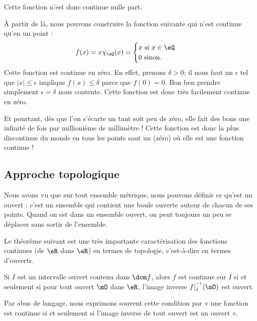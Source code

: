 Cette fonction n'est donc continue nulle part.

À partir de là, nous pouvons construire la fonction suivante qui n'est continue qu'en un point :
\[
	f(x)=x\chi_{\eQ}(x)=
	\begin{cases}
		x\text{ si }x\in\eQ \\
		0\text{ sinon.}
	\end{cases}
\]
Cette fonction est continue en zéro. En effet, prenons $\delta>0$; il nous faut un $\epsilon$ tel que $| x |\leq\epsilon$ implique $f(x)\leq \delta$ parce que $f(0)=0$. Bon ben prendre simplement $\epsilon=\delta$ nous contente. Cette fonction est donc très facilement continue en zéro.

Et pourtant, dès que l'on s'écarte un tant soit peu de zéro, elle fait des bons une infinité de fois par millionième de millimètre ! Cette fonction est donc la plus discontinue du monde en tous les points saut un (zéro) où elle est une fonction continue !

\subsection{Approche topologique}

Nous avons vu que sur tout ensemble métrique, nous pouvons définir ce qu'est un ouvert : c'est un ensemble qui contient une boule ouverte autour de chacun de ses points. Quand on est dans un ensemble ouvert, on peut toujours un peu se déplacer sans sortir de l'ensemble.

Le théorème suivant est une très importante caractérisation des fonctions continues (de $\eR$ dans $\eR$) en termes de topologie, c'est-à-dire en termes d'ouverts.

\begin{theorem}     \label{ThoContInvOuvert}
	Si $I$ est un intervalle ouvert contenu dans $\dom f$, alors $f$ est continue sur $I$ si et seulement si pour tout ouvert $\mO$ dans $\eR$, l'image inverse $f|_I^{^{-1}}(\mO)$ est ouvert.
\end{theorem}

Par abus de langage, nous exprimons souvent cette condition par « une fonction est continue si et seulement si l'image inverse de tout ouvert est un ouvert ».

